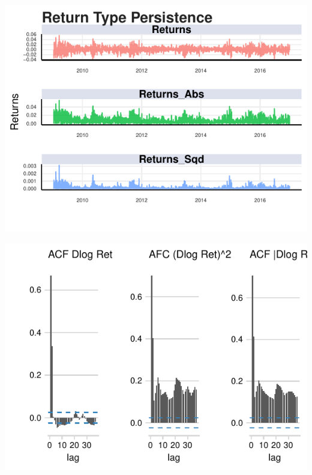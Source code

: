 \documentclass[11pt,preprint, authoryear]{elsarticle}
\let\origfigure\figure
\let\endorigfigure\endfigure
\renewenvironment{figure}[1][2] {
    \expandafter\origfigure\expandafter[H]
} {
    \endorigfigure
}
\numberwithin{equation}{section}
\numberwithin{figure}{section}
\numberwithin{table}{section}
\begin{document}
\begin{figure}[H]

{\centering \includegraphics{Essay_files/figure-latex/garch_plot_1 -1} 

}

\caption{Plots of returns, squared returns and absolute value of returns \label{ret_plot}}\label{fig:garch_plot_1 }
\end{figure}

\begin{figure}[H]

{\centering \includegraphics{Essay_files/figure-latex/garch_plot_2 -1} 

}

\caption{ACF plots of returns, squared returns and absolute value of returns \label{ACFs}}\label{fig:garch_plot_2 }
\end{figure}
\end{document}
